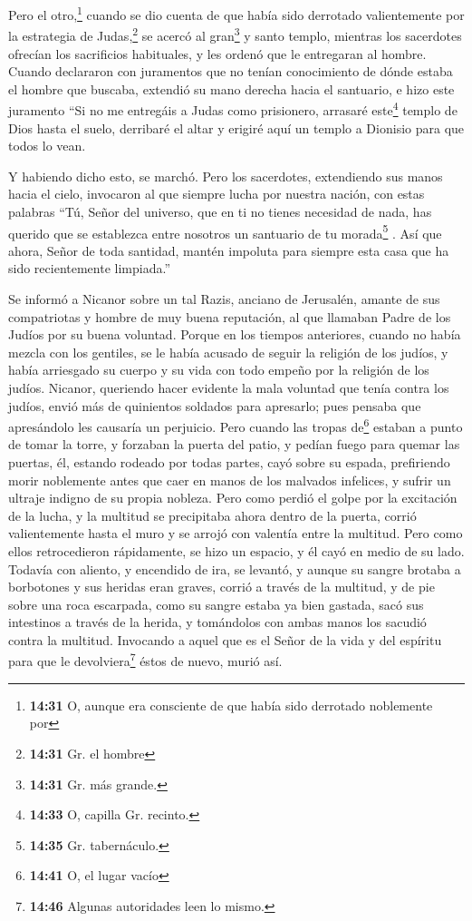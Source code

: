  Pero el otro,\footnote{\textbf{14:31} O, aunque era
  consciente de que había sido derrotado noblemente por} cuando se dio
cuenta de que había sido derrotado valientemente por la estrategia de
Judas,\footnote{\textbf{14:31} Gr. el hombre} se acercó al
gran\footnote{\textbf{14:31} Gr. más grande.} y santo templo, mientras
los sacerdotes ofrecían los sacrificios habituales, y les ordenó que le
entregaran al hombre.  Cuando declararon con juramentos
que no tenían conocimiento de dónde estaba el hombre que buscaba,
 extendió su mano derecha hacia el santuario, e hizo este
juramento ``Si no me entregáis a Judas como prisionero, arrasaré
este\footnote{\textbf{14:33} O, capilla Gr. recinto.} templo de Dios
hasta el suelo, derribaré el altar y erigiré aquí un templo a Dionisio
para que todos lo vean.

 Y habiendo dicho esto, se marchó. Pero los sacerdotes,
extendiendo sus manos hacia el cielo, invocaron al que siempre lucha por
nuestra nación, con estas palabras  ``Tú, Señor del
universo, que en ti no tienes necesidad de nada, has querido que se
establezca entre nosotros un santuario de tu morada\footnote{\textbf{14:35}
  Gr. tabernáculo.} .  Así que ahora, Señor de toda
santidad, mantén impoluta para siempre esta casa que ha sido
recientemente limpiada.''

 Se informó a Nicanor sobre un tal Razis, anciano de
Jerusalén, amante de sus compatriotas y hombre de muy buena reputación,
al que llamaban Padre de los Judíos por su buena voluntad.
 Porque en los tiempos anteriores, cuando no había mezcla
con los gentiles, se le había acusado de seguir la religión de los
judíos, y había arriesgado su cuerpo y su vida con todo empeño por la
religión de los judíos.  Nicanor, queriendo hacer
evidente la mala voluntad que tenía contra los judíos, envió más de
quinientos soldados para apresarlo;  pues pensaba que
apresándolo les causaría un perjuicio.  Pero cuando las
tropas de\footnote{\textbf{14:41} O, el lugar vacío} estaban a punto de
tomar la torre, y forzaban la puerta del patio, y pedían fuego para
quemar las puertas, él, estando rodeado por todas partes, cayó sobre su
espada,  prefiriendo morir noblemente antes que caer en
manos de los malvados infelices, y sufrir un ultraje indigno de su
propia nobleza.  Pero como perdió el golpe por la
excitación de la lucha, y la multitud se precipitaba ahora dentro de la
puerta, corrió valientemente hasta el muro y se arrojó con valentía
entre la multitud.  Pero como ellos retrocedieron
rápidamente, se hizo un espacio, y él cayó en medio de su lado.
 Todavía con aliento, y encendido de ira, se levantó, y
aunque su sangre brotaba a borbotones y sus heridas eran graves, corrió
a través de la multitud, y de pie sobre una roca escarpada,
 como su sangre estaba ya bien gastada, sacó sus
intestinos a través de la herida, y tomándolos con ambas manos los
sacudió contra la multitud. Invocando a aquel que es el Señor de la vida
y del espíritu para que le devolviera\footnote{\textbf{14:46} Algunas
  autoridades leen lo mismo.} éstos de nuevo, murió así.


